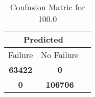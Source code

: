 \begin{table}[] 
\caption{Confusion Matric for 100.0} 
\label{Table: Prediction Accuracy-DMD100.0DecisionTrees100EKF-ignoresolarPanelDipole-solarPanelDipole} 
\centering 
\begin{tabular} 
 {@{}ccc@{}} 
\toprule 
\multicolumn{2}{c}{\textbf{Predicted}}
 \\ \midrule 
\multicolumn{1}{|c|}{Failure} & 
\multicolumn{1}{c|}{No Failure}
 \\ \midrule 
\multicolumn{1}{|c|}{\color{green}\textbf{63422}} & 
\multicolumn{1}{c|}{\color{red}\textbf{0}}
 \\ \midrule 
\multicolumn{1}{|c|}{\color{red}\textbf{0}} & 
\multicolumn{1}{c|}{\color{green}\textbf{106706}}
 \\ \bottomrule 
\end{tabular} 
\end{table} 
